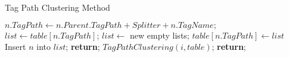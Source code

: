 %
%
%
%

\begin{algorithm}
\caption{Tag Path Clustering Method}
\label{algo:tagPath}
\begin{algorithmic}[1]
\State $n.TagPath \gets n.Parent.TagPath+Splitter+n.TagName;$
        \State  $list \gets table[n.TagPath]$;
    \Else
        \State  $list \gets$ new empty lists;
        \State  $table[n.TagPath] \gets list$
    \EndIf
    \State  Insert $n$ into $list$;
    \State \textbf{return};
\EndIf
{}
    \State $TagPathClustering(i,table)$;
\EndFor
\State \textbf{return};

\EndProcedure
\end{algorithmic}
\end{algorithm}

